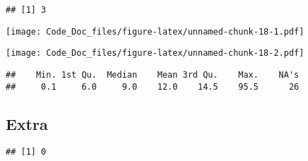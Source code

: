 \documentclass[]{article}
\newenvironment{Shaded}{\begin{snugshade}}{\end{snugshade}}
\newcommand{\KeywordTok}[1]{\textcolor[rgb]{0.13,0.29,0.53}{\textbf{{#1}}}}
\newcommand{\DataTypeTok}[1]{\textcolor[rgb]{0.13,0.29,0.53}{{#1}}}
\newcommand{\StringTok}[1]{\textcolor[rgb]{0.31,0.60,0.02}{{#1}}}
\newcommand{\CommentTok}[1]{\textcolor[rgb]{0.56,0.35,0.01}{\textit{{#1}}}}
\newcommand{\OtherTok}[1]{\textcolor[rgb]{0.56,0.35,0.01}{{#1}}}
\newcommand{\NormalTok}[1]{{#1}}
\begin{document}
\begin{verbatim}
## [1] 3
\end{verbatim}

\begin{Shaded}
\end{Shaded}

\texttt{[image: Code\_Doc\_files/figure-latex/unnamed-chunk-18-1.pdf]}

\begin{Shaded}
\end{Shaded}

\texttt{[image: Code\_Doc\_files/figure-latex/unnamed-chunk-18-2.pdf]}

\begin{Shaded}
\end{Shaded}

\begin{verbatim}
##    Min. 1st Qu.  Median    Mean 3rd Qu.    Max.    NA's 
##     0.1     6.0     9.0    12.0    14.5    95.5      26
\end{verbatim}

\subsection{Extra}\label{extra}

\begin{Shaded}
\end{Shaded}

\begin{verbatim}
## [1] 0
\end{verbatim}
\end{document}

